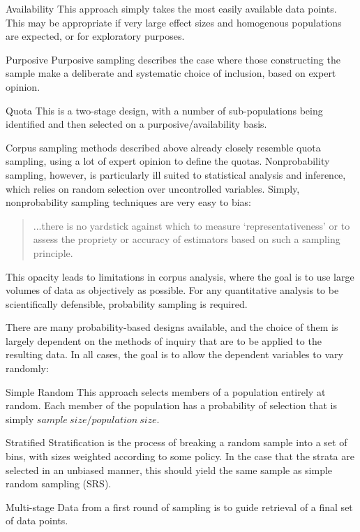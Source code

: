 \begin{itemizeTitle}

    \item[Availability] This approach simply takes the most easily available data points.  This may be appropriate if very large effect sizes and homogenous populations are expected, or for exploratory purposes.

    \item[Purposive] Purposive sampling describes the case where those constructing the sample make a deliberate and systematic choice of inclusion, based on expert opinion.
        
    \item[Quota] This is a two-stage design, with a number of sub-populations being identified and then selected on a purposive/availability basis.

\end{itemizeTitle}

Corpus sampling methods described above already closely resemble quota sampling, using a lot of expert opinion to define the quotas.  Nonprobability sampling, however, is particularly ill suited to statistical analysis and inference, which relies on random selection over uncontrolled variables.  Simply, nonprobability sampling techniques are very easy to bias:

\begin{quote}
...there is no yardstick against which to measure `representativeness' or to assess the propriety or accuracy of estimators based on such a sampling principle.
\end{quote}

This opacity leads to limitations in corpus analysis, where the goal is to use large volumes of data as objectively as possible.  For any quantitative analysis to be scientifically defensible, probability sampling is required.

There are many probability-based designs available, and the choice of them is largely dependent on the methods of inquiry that are to be applied to the resulting data.  In all cases, the goal is to allow the dependent variables to vary randomly:

\begin{itemizeTitle}

    \item[Simple Random] This approach selects members of a population entirely at random.  Each member of the population has a probability of selection that is simply $sample~size/population~size$.

    \item[Stratified] Stratification is the process of breaking a random sample into a set of bins, with sizes weighted according to some policy.  In the case that the strata are selected in an unbiased manner, this should yield the same sample as simple random sampling (SRS).

    \item[Multi-stage] Data from a first round of sampling is to guide retrieval of a final set of data points.

\end{itemizeTitle}

